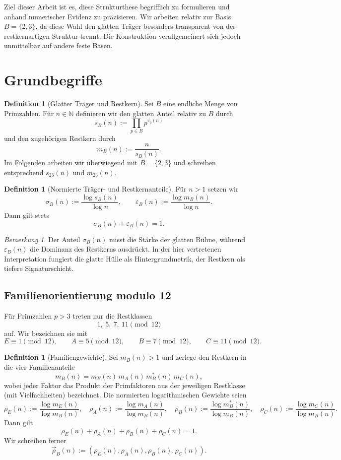\documentclass[11pt,a4paper]{article}
\theoremstyle{definition}
\newtheorem{definition}[satz]{Definition}
\theoremstyle{remark}
\newtheorem{bemerkung}[satz]{Bemerkung}
\begin{document}
Ziel dieser Arbeit ist es, diese Strukturthese begrifflich zu formulieren und anhand numerischer Evidenz zu präzisieren. Wir arbeiten relativ zur Basis $B=\{2,3\}$, da diese Wahl den glatten Träger besonders transparent von der restkernartigen Struktur trennt. Die Konstruktion verallgemeinert sich jedoch unmittelbar auf andere feste Basen.

\section{Grundbegriffe}

\begin{definition}[Glatter Träger und Restkern]
Sei $B$ eine endliche Menge von Primzahlen. Für $n\in\mathbb N$ definieren wir den glatten Anteil relativ zu $B$ durch
\[
 s_B(n):=\prod_{p\in B} p^{v_p(n)}
\]
und den zugehörigen Restkern durch
\[
 m_B(n):=\frac{n}{s_B(n)}.
\]
Im Folgenden arbeiten wir überwiegend mit $B=\{2,3\}$ und schreiben entsprechend $s_{23}(n)$ und $m_{23}(n)$.
\end{definition}

\begin{definition}[Normierte Träger- und Restkernanteile]
Für $n>1$ setzen wir
\[
 \sigma_B(n):=\frac{\log s_B(n)}{\log n},
 \qquad
 \varepsilon_B(n):=\frac{\log m_B(n)}{\log n}.
\]
Dann gilt stets
\[
 \sigma_B(n)+\varepsilon_B(n)=1.
\]
\end{definition}

\begin{bemerkung}
Der Anteil $\sigma_B(n)$ misst die Stärke der glatten Bühne, während $\varepsilon_B(n)$ die Dominanz des Restkerns ausdrückt. In der hier vertretenen Interpretation fungiert die glatte Hülle als Hintergrundmetrik, der Restkern als tiefere Signaturschicht.
\end{bemerkung}

\subsection{Familienorientierung modulo 12}
Für Primzahlen $p>3$ treten nur die Restklassen
\[
1,\ 5,\ 7,\ 11 \pmod{12}
\]
auf. Wir bezeichnen sie mit
\[
E\equiv 1\pmod{12},\qquad
A\equiv 5\pmod{12},\qquad
B\equiv 7\pmod{12},\qquad
C\equiv 11\pmod{12}.
\]

\begin{definition}[Familiengewichte]
Sei $m_B(n)>1$ und zerlege den Restkern in die vier Familienanteile
\[
 m_B(n)=m_E(n)\,m_A(n)\,m_B^{\ast}(n)\,m_C(n),
\]
wobei jeder Faktor das Produkt der Primfaktoren aus der jeweiligen Restklasse (mit Vielfachheiten) bezeichnet. Die normierten logarithmischen Gewichte seien
\[
 \rho_E(n):=\frac{\log m_E(n)}{\log m_B(n)},\quad
 \rho_A(n):=\frac{\log m_A(n)}{\log m_B(n)},\quad
 \rho_B(n):=\frac{\log m_B^{\ast}(n)}{\log m_B(n)},\quad
 \rho_C(n):=\frac{\log m_C(n)}{\log m_B(n)}.
\]
Dann gilt
\[
 \rho_E(n)+\rho_A(n)+\rho_B(n)+\rho_C(n)=1.
\]
Wir schreiben ferner
\[
 \vec\rho_B(n):=(\rho_E(n),\rho_A(n),\rho_B(n),\rho_C(n)).
\]
\end{definition}
\end{document}
